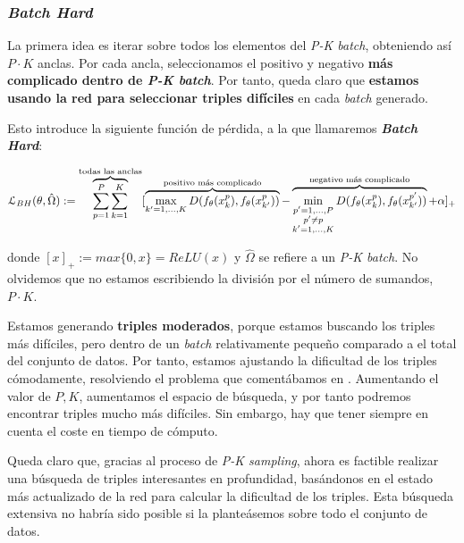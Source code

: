 \subsubsection{\textit{Batch Hard}} \label{isubsubs:batch_hard}

La primera idea es iterar sobre todos los elementos del \textit{P-K batch}, obteniendo así $P \cdot K$ anclas. Por cada ancla, seleccionamos el positivo y negativo \textbf{más complicado dentro de \textit{P-K batch}}. Por tanto, queda claro que \textbf{estamos usando la red para seleccionar triples difíciles} en cada \textit{batch} generado.

Esto introduce la siguiente función de pérdida, a la que llamaremos \textbf{\textit{Batch Hard}}:

\begin{equation}
    \mathcal{L}_{BH}(\theta, \hat{\Omega}) := \overbrace{\sum_{p = 1}^P \sum_{k = 1}^K}^\textrm{\text{todas las anclas}} [
        \overbrace{\max_{k' = 1, \ldots, K} D(f_{\theta}(x_k^p), f_{\theta}(x_{k'}^p))}^\textrm{\text{positivo más complicado}}
        - \overbrace{\min_{\substack{p' = 1, \ldots, P \\ p' \neq p \\ k' = 1, \ldots, K}} D(f_{\theta}(x_k^p), f_{\theta}(x_{k'}^{p'}))}^\textrm{\text{negativo más complicado}}
        + \alpha]_+
\end{equation}

donde $[x]_+ := max \{0, x\} = ReLU(x)$ y $\hat{\Omega}$ se refiere a un \textit{P-K batch}. No olvidemos que no estamos escribiendo la división por el número de sumandos, $P \cdot K$.

Estamos generando \textbf{triples moderados}, porque estamos buscando los triples más difíciles, pero dentro de un \textit{batch} relativamente pequeño comparado a el total del conjunto de datos. Por tanto, estamos ajustando la dificultad de los triples cómodamente, resolviendo el problema que comentábamos en . Aumentando el valor de $P, K$, aumentamos el espacio de búsqueda, y por tanto podremos encontrar triples mucho más difíciles. Sin embargo, hay que tener siempre en cuenta el coste en tiempo de cómputo.

Queda claro que, gracias al proceso de \textit{P-K sampling}, ahora es factible realizar una búsqueda de triples interesantes en profundidad, basándonos en el estado más actualizado de la red para calcular la dificultad de los triples. Esta búsqueda extensiva no habría sido posible si la planteásemos sobre todo el conjunto de datos.


